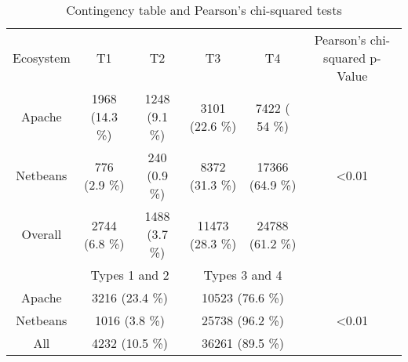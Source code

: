 \begin{table*}[]
\centering
\small
\caption{Contingency table and Pearson's chi-squared tests}
\label{tab:contingency-table}
\begin{tabular}{cccccc}
Ecosystem & T1                 & T2               & T3                & T4                & Pearson's chi-squared p-Value                          \\ \rowcolor{gray!25}
Apache    & 1968  (14.3 \%)   & 1248  (9.1 \%)  & 3101  (22.6 \%)  &7422  ( 54 \%)    &  \\ \rowcolor{gray!25}
Netbeans  & 776  (2.9 \%)     & 240  (0.9 \%)   & 8372  (31.3 \%)  & 17366  (64.9 \%) &  \textless0.01                               \\ \rowcolor{gray!25}
Overall   & 2744  (6.8 \%)    & 1488  (3.7 \%)  & 11473  (28.3 \%) & 24788  (61.2 \%) &                                \\
          & \multicolumn{2}{c}{Types 1 and 2}     & \multicolumn{2}{c}{Types 3 and 4}     &                           \\ \rowcolor{gray!25}
Apache    & \multicolumn{2}{c}{3216  (23.4 \%)}  & \multicolumn{2}{c}{10523  (76.6 \%)} & \\ \rowcolor{gray!25}
Netbeans  & \multicolumn{2}{c}{1016  (3.8 \%)}   & \multicolumn{2}{c}{25738  (96.2 \%)} & \textless0.01                               \\ \rowcolor{gray!25}
All       & \multicolumn{2}{c}{4232  (10.5 \%)}  & \multicolumn{2}{c}{36261  (89.5 \%)} &                                \\
\end{tabular}
\end{table*}
